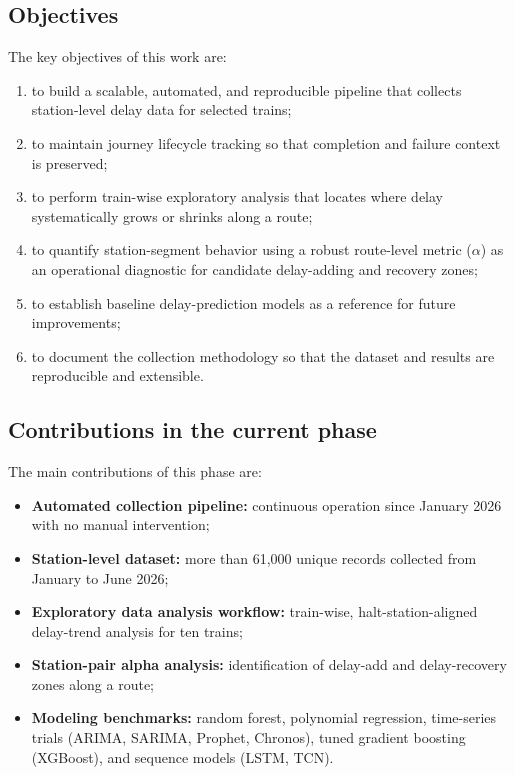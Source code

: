 \documentclass[a4paper,fleqn]{cas-dc}
\begin{document}
\subsection{Objectives}
The key objectives of this work are:
\begin{enumerate}
    \item to build a scalable, automated, and reproducible pipeline that
          collects station-level delay data for selected trains;
    \item to maintain journey lifecycle tracking so that completion and
          failure context is preserved;
    \item to perform train-wise exploratory analysis that locates where
          delay systematically grows or shrinks along a route;
    \item to quantify station-segment behavior using a robust route-level
          metric ($\alpha$) as an operational diagnostic for candidate
          delay-adding and recovery zones;
    \item to establish baseline delay-prediction models as a reference for
          future improvements;
    \item to document the collection methodology so that the dataset and
          results are reproducible and extensible.
\end{enumerate}

\subsection{Contributions in the current phase}
The main contributions of this phase are:
\begin{itemize}
    \item \textbf{Automated collection pipeline:} continuous operation
          since January 2026 with no manual intervention;
    \item \textbf{Station-level dataset:} more than 61{,}000 unique records
          collected from January to June 2026;
    \item \textbf{Exploratory data analysis workflow:} train-wise,
          halt-station-aligned delay-trend analysis for ten trains;
    \item \textbf{Station-pair alpha analysis:} identification of
          delay-add and delay-recovery zones along a route;
    \item \textbf{Modeling benchmarks:} random forest, polynomial
          regression, time-series trials (ARIMA, SARIMA, Prophet, Chronos),
          tuned gradient boosting (XGBoost), and sequence models (LSTM, TCN).
\end{itemize}
\end{document}
